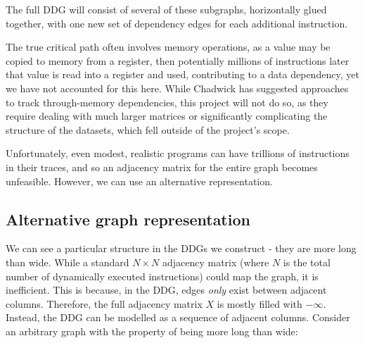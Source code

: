 The full DDG will consist of several of these subgraphs, horizontally glued together, with one new set of dependency edges 
for each additional instruction.

The true critical path often involves memory operations, as a value may be copied to memory from a register, then 
potentially millions of instructions later that value is read into a register and used, contributing to a data dependency,
yet we have not accounted for this here. While Chadwick \cite{Chadderz} has suggested approaches to track through-memory
dependencies, this project will not do so, as they require dealing with much larger matrices or significantly complicating 
the structure of the datasets, which fell outside of the project's scope.

Unfortunately, even modest, realistic programs can have trillions of instructions in their 
traces, and so an adjacency matrix for the entire graph becomes unfeasible. However, we can use an alternative 
representation.

\subsection{Alternative graph representation} \label{prep:alternative-matrix-struct}


We can see a particular structure in the DDGs we construct - they are more long than wide. While a 
standard $N \times N$ adjacency matrix (where $N$ is the total number of dynamically executed instructions) could 
map the graph, it is inefficient.
This is because, in the DDG, edges \textit{only} exist between adjacent columns.
Therefore, the full adjacency matrix $X$ is mostly filled with $-\infty$.
Instead, the DDG can be modelled as a sequence of adjacent columns. 
Consider an arbitrary graph with the property of being more long than wide:

\begin{center}
\end{center}

